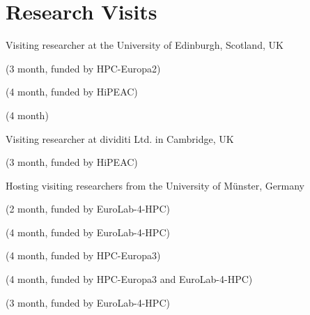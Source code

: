 \section{Research Visits}
\begin{cvitemize}
  \item Visiting researcher at the University of Edinburgh, Scotland, UK
      \begin{inlineItemize}
        \item {} (3 month, funded by HPC-Europa2)
        \item {} (4 month, funded by HiPEAC)
        \item {} (4 month)
      \end{inlineItemize}
   \item Visiting researcher at dividiti Ltd. in Cambridge, UK
      \begin{inlineItemize}
        \item {} (3 month, funded by HiPEAC)
      \end{inlineItemize}
   \item Hosting visiting researchers from the University of Münster, Germany
      \begin{inlineItemize}
        \item {} (2 month, funded by EuroLab-4-HPC)
        \item {} (4 month, funded by EuroLab-4-HPC)
        \item {} (4 month, funded by HPC-Europa3)
        \item {} (4 month, funded by HPC-Europa3 and EuroLab-4-HPC)
        \item {} (3 month, funded by EuroLab-4-HPC)
      \end{inlineItemize}
\end{cvitemize}
